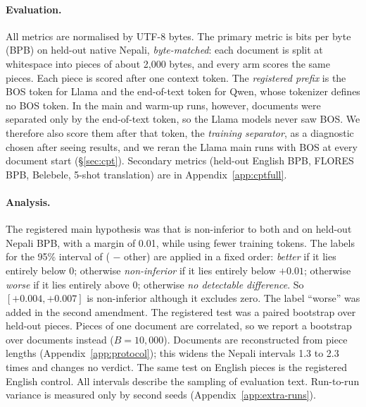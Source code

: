 \paragraph{Evaluation.} All metrics are normalised by UTF-8 bytes. The primary metric is bits per byte (BPB) on held-out native Nepali, \emph{byte-matched}: each document is split at whitespace into pieces of about 2{,}000 bytes, and every arm scores the same pieces. Each piece is scored after one context token. The \emph{registered prefix} is the BOS token for Llama and the end-of-text token for Qwen, whose tokenizer defines no BOS token. In the main and warm-up runs, however, documents were separated only by the end-of-text token, so the Llama models never saw BOS. We therefore also score them after that token, the \emph{training separator}, as a diagnostic chosen after seeing results, and we reran the Llama main runs with BOS at every document start (\S\ref{sec:cpt}). Secondary metrics (held-out English BPB, FLORES BPB, Belebele, 5-shot translation) are in Appendix~\ref{app:cptfull}.

\paragraph{Analysis.} The registered main hypothesis was that \RII{} is non-inferior to both \RI{} and \RO{} on held-out Nepali BPB, with a margin of 0.01, while using fewer training tokens. The labels for the 95\% interval of (\RII{} $-$ other) are applied in a fixed order: \emph{better} if it lies entirely below 0; otherwise \emph{non-inferior} if it lies entirely below $+0.01$; otherwise \emph{worse} if it lies entirely above 0; otherwise \emph{no detectable difference}. So $[+0.004, +0.007]$ is non-inferior although it excludes zero. The label ``worse'' was added in the second amendment. The registered test was a paired bootstrap over held-out pieces. Pieces of one document are correlated, so we report a bootstrap over documents instead ($B{=}10{,}000$). Documents are reconstructed from piece lengths (Appendix~\ref{app:protocol}); this widens the Nepali intervals 1.3 to 2.3 times and changes no verdict. The same test on English pieces is the registered English control. All intervals describe the sampling of evaluation text. Run-to-run variance is measured only by second seeds (Appendix~\ref{app:extra-runs}).
